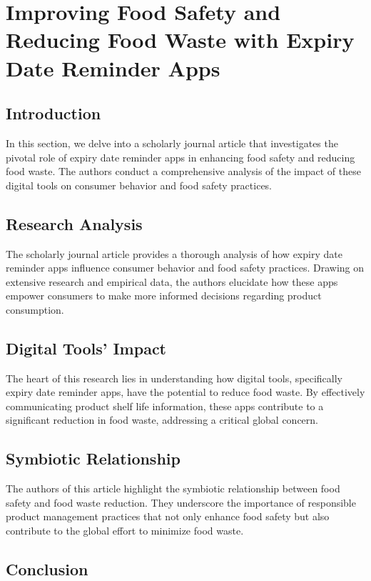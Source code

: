 \section{Improving Food Safety and Reducing Food Waste with Expiry Date Reminder Apps}

\subsection{Introduction}

In this section, we delve into a scholarly journal article that investigates the pivotal role of expiry date reminder apps in enhancing food safety and reducing food waste. The authors conduct a comprehensive analysis of the impact of these digital tools on consumer behavior and food safety practices.

\subsection{Research Analysis}

The scholarly journal article provides a thorough analysis of how expiry date reminder apps influence consumer behavior and food safety practices. Drawing on extensive research and empirical data, the authors elucidate how these apps empower consumers to make more informed decisions regarding product consumption.

\subsection{Digital Tools' Impact}

The heart of this research lies in understanding how digital tools, specifically expiry date reminder apps, have the potential to reduce food waste. By effectively communicating product shelf life information, these apps contribute to a significant reduction in food waste, addressing a critical global concern.

\subsection{Symbiotic Relationship}

The authors of this article highlight the symbiotic relationship between food safety and food waste reduction. They underscore the importance of responsible product management practices that not only enhance food safety but also contribute to the global effort to minimize food waste.

\subsection{Conclusion}

